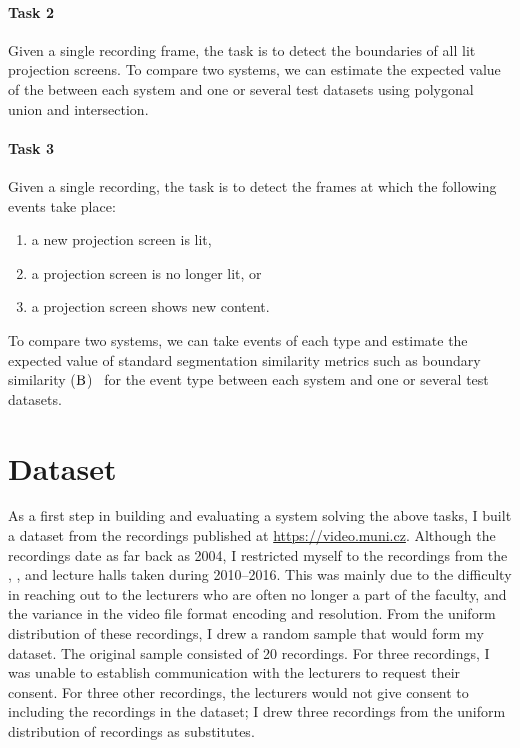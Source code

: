 \paragraph{Task 2} Given a single recording frame, the task is to detect the
boundaries of all lit projection screens. To compare two systems, we can
estimate the expected value of the  between each system and
one or several test datasets using polygonal union and intersection.

\paragraph{Task 3} Given a single recording, the task is to detect the frames
at which the following events take place:
\begin{enumerate}
  \item a new projection screen is lit,
  \item a projection screen is no longer lit, or
  \item a projection screen shows new content.
\end{enumerate}
To compare two systems, we can take events of each type and estimate the
expected value of standard segmentation similarity metrics such as boundary
similarity ($\textrm B$)~\cite{P13-1167} for the event type between each system
and one or several test datasets.

\section{Dataset}
\label{sec:dataset}
As a first step in building and evaluating a system solving the above tasks, I
built a dataset from the recordings published at \url{https://video.muni.cz}.
Although the recordings date as far back as 2004, I restricted myself to the
recordings from the , , and  lecture halls taken
during 2010--2016. This was mainly due to the difficulty in reaching out to
the lecturers who are often no longer a part of the faculty, and the variance
in the video file format encoding and resolution. From the uniform distribution
of these recordings, I drew a random sample that would form my dataset.
The original sample consisted of 20 recordings. For three recordings, I was
unable to establish communication with the lecturers to request their consent.
For three other recordings, the lecturers would not give consent to including
the recordings in the dataset; I drew three recordings from the uniform
distribution of recordings as substitutes.

